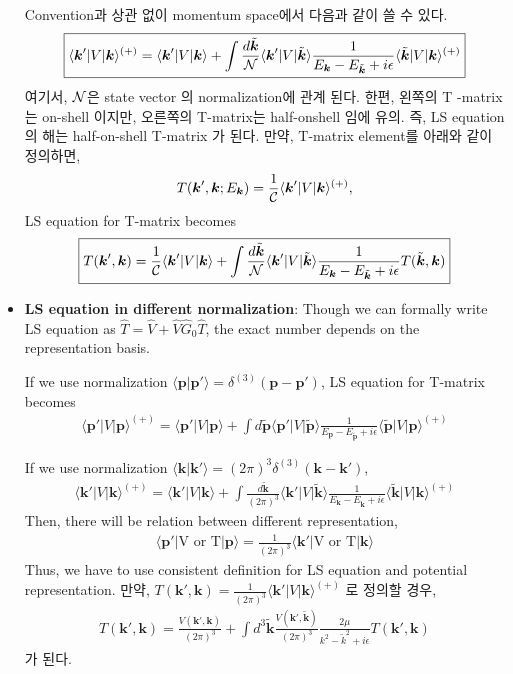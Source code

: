 \documentclass[10pt]{book}
\def\bm{\boldsymbol}
\newcommand{\bea}{\begin{eqnarray}}
\newcommand{\eea}{\end{eqnarray}}
\def\vp{{\bm p}}
\def\vk{{\bm k}}
\def\la{\langle}
\def\ra{\rangle}
\begin{document}
\begin{itemize}
Convention과 상관 없이 momentum space에서 다음과 같이 쓸 수 있다.
\bea
\boxed{
\la\vk'|V|\vk\ra^{(+)}
=\la \vk'|V|\vk\ra
+\int \frac{d\tilde{\vk}}{\cal N}
\la \vk'|V|\tilde{\vk}\ra
\frac{1}{E_\vk-E_{\tilde{\vk}}+i\epsilon}
\la\tilde{\vk}|V|\vk\ra^{(+)} 
}
\eea
여기서, ${\cal N}$은 state vector 의 normalization에 관계 된다. 
한편, 왼쪽의 T -matrix는 on-shell 이지만, 오른쪽의 T-matrix는 
half-onshell 임에 유의. 즉, LS equation 의 해는 half-on-shell T-matrix 가 된다.  
만약, T-matrix element를 아래와 같이 정의하면,
\bea 
T(\vk',\vk;E_\vk)=\frac{1}{\cal C}\la \vk'|V|\vk\ra^{(+)},
\eea 
LS equation for T-matrix becomes
\bea 
\boxed{ 
T(\vk',\vk)
=\frac{1}{\cal C}\la \vk'|V|\vk\ra
+\int \frac{d\tilde{\vk}}{\cal N}
\la \vk'|V|\tilde{\vk}\ra
\frac{1}{E_\vk-E_{\tilde{\vk}}+i\epsilon}
T(\tilde{\vk},\vk) }
\eea 
\item {\bf LS equation in different normalization}: Though we can formally write LS equation as
$ \hat{T}={\hat V}+\hat{V} \hat{G}_0 \hat{T} $, the exact number depends on the representation
basis.

If we use normalization $\la \vp|\vp'\ra=\delta^{(3)}(\vp-\vp') $, LS equation for T-matrix becomes
\bea 
\la\vp'|V|\vp\ra^{(+)}
=\la \vp'|V|\vp\ra
+\int d\tilde{\vp}
\la \vp'|V|\tilde{\vp}\ra
\frac{1}{E_\vp-E_{\tilde{\vp}}+i\epsilon}
\la\tilde{\vp}|V|\vp\ra^{(+)}
\eea  

If we use normalization $\la \vk|\vk'\ra=(2\pi)^3\delta^{(3)}(\vk-\vk') $,
\bea 
\la\vk'|V|\vk\ra^{(+)}
=\la \vk'|V|\vk\ra
+\int \frac{d\tilde{\vk}}{(2\pi)^3}
\la \vk'|V|\tilde{\vk}\ra
\frac{1}{E_\vk-E_{\tilde{\vk}}+i\epsilon}
\la\tilde{\vk}|V|\vk\ra^{(+)}
\eea 
Then, there will be relation between different representation,
\bea 
\la \vp'|\mbox{V or T}|\vp\ra =\frac{1}{(2\pi)^3} \la \vk'|\mbox{V or T}|\vk\ra
\eea 
Thus, we have to use consistent definition for LS equation and potential representation.
만약, $T(\vk',\vk)=\frac{1}{(2\pi)^3}\la \vk'|V|\vk\ra^{(+)}$ 로 정의할 경우,
\bea
T(\vk',\vk)=\frac{V(\vk',\vk)}{(2\pi)^3}
           +\int d^3{\tilde\vk}
           \frac{V(\vk',{\tilde\vk})}{(2\pi)^3}
           \frac{2\mu}{k^2-\tilde{k}^2+i\epsilon}
           T(\vk',\vk)
\eea
가 된다. 


\end{itemize}
\end{document}

